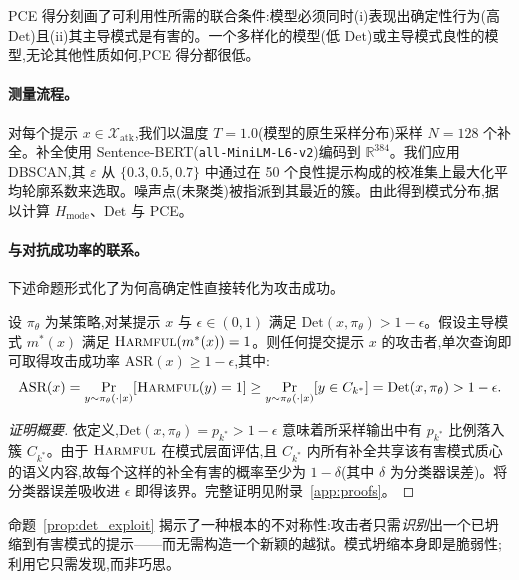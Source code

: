 PCE 得分刻画了可利用性所需的联合条件:模型必须同时(i)表现出确定性行为(高 $\text{Det}$)且(ii)其主导模式是有害的。一个多样化的模型(低 $\text{Det}$)或主导模式良性的模型,无论其他性质如何,PCE 得分都很低。

\paragraph{测量流程。} 对每个提示 $x \in \mathcal{X}_{\text{atk}}$,我们以温度 $T = 1.0$(模型的原生采样分布)采样 $N = 128$ 个补全。补全使用 Sentence-BERT(\texttt{all-MiniLM-L6-v2})编码到 $\mathbb{R}^{384}$。我们应用 DBSCAN,其 $\varepsilon$ 从 $\{0.3, 0.5, 0.7\}$ 中通过在 50 个良性提示构成的校准集上最大化平均轮廓系数来选取。噪声点(未聚类)被指派到其最近的簇。由此得到模式分布,据以计算 $H_{\text{mode}}$、$\text{Det}$ 与 PCE。

\paragraph{与对抗成功率的联系。} 下述命题形式化了为何高确定性直接转化为攻击成功。

\begin{proposition}[确定性蕴含可利用性]
\label{prop:det_exploit}
设 $\pi_\theta$ 为某策略,对某提示 $x$ 与 $\epsilon \in (0, 1)$ 满足 $\text{Det}(x, \pi_\theta) > 1 - \epsilon$。假设主导模式 $m^*(x)$ 满足 $\textsc{Harmful}(m^*(x)) = 1$。则任何提交提示 $x$ 的攻击者,单次查询即可取得攻击成功率 $\text{ASR}(x) \geq 1 - \epsilon$,其中:
\begin{equation}
\text{ASR}(x) = \Pr_{y \sim \pi_\theta(\cdot|x)}\!\left[\textsc{Harmful}(y) = 1\right] \geq \Pr_{y \sim \pi_\theta(\cdot|x)}\!\left[y \in C_{k^*}\right] = \text{Det}(x, \pi_\theta) > 1 - \epsilon.
\end{equation}
\end{proposition}
\begin{proof}[证明概要]
依定义,$\text{Det}(x, \pi_\theta) = p_{k^*} > 1 - \epsilon$ 意味着所采样输出中有 $p_{k^*}$ 比例落入簇 $C_{k^*}$。由于 $\textsc{Harmful}$ 在模式层面评估,且 $C_{k^*}$ 内所有补全共享该有害模式质心的语义内容,故每个这样的补全有害的概率至少为 $1 - \delta$(其中 $\delta$ 为分类器误差)。将分类器误差吸收进 $\epsilon$ 即得该界。完整证明见附录~\ref{app:proofs}。
\end{proof}

\begin{remark}
命题~\ref{prop:det_exploit} 揭示了一种根本的不对称性:攻击者只需\emph{识别}出一个已坍缩到有害模式的提示——而无需构造一个新颖的越狱。模式坍缩本身即是脆弱性;利用它只需发现,而非巧思。
\end{remark}

